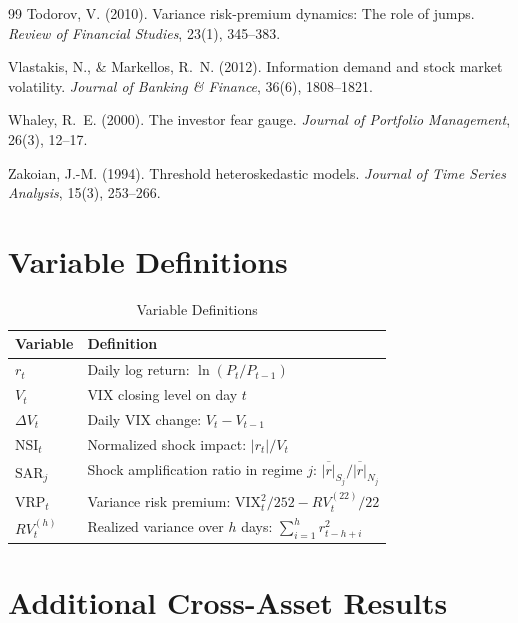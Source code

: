 \documentclass[12pt,a4paper]{article}
\begin{document}
\begin{thebibliography}{99}
Todorov, V. (2010). Variance risk-premium dynamics: The role of jumps. \textit{Review of Financial Studies}, 23(1), 345--383.

Vlastakis, N., \& Markellos, R.~N. (2012). Information demand and stock market volatility. \textit{Journal of Banking \& Finance}, 36(6), 1808--1821.

Whaley, R.~E. (2000). The investor fear gauge. \textit{Journal of Portfolio Management}, 26(3), 12--17.

Zakoian, J.-M. (1994). Threshold heteroskedastic models. \textit{Journal of Time Series Analysis}, 15(3), 253--266.

\end{thebibliography}


\newpage
\appendix
\section{Variable Definitions}
\label{app:variables}

\begin{table}[H]
\centering
\caption{Variable Definitions}
\label{tab:variables}
\begin{tabular}{lp{10cm}}
\toprule
Variable & Definition \\
\midrule
$r_t$ & Daily log return: $\ln(P_t / P_{t-1})$ \\
$V_t$ & VIX closing level on day $t$ \\
$\Delta V_t$ & Daily VIX change: $V_t - V_{t-1}$ \\
$\text{NSI}_t$ & Normalized shock impact: $|r_t| / V_t$ \\
$\text{SAR}_j$ & Shock amplification ratio in regime $j$: $\overline{|r|}_{S_j} / \overline{|r|}_{N_j}$ \\
$\text{VRP}_t$ & Variance risk premium: $\text{VIX}_t^2 / 252 - RV_t^{(22)} / 22$ \\
$RV_t^{(h)}$ & Realized variance over $h$ days: $\sum_{i=1}^{h} r_{t-h+i}^2$ \\
\bottomrule
\end{tabular}
\end{table}

\section{Additional Cross-Asset Results}
\label{app:cross_asset}
\end{document}
